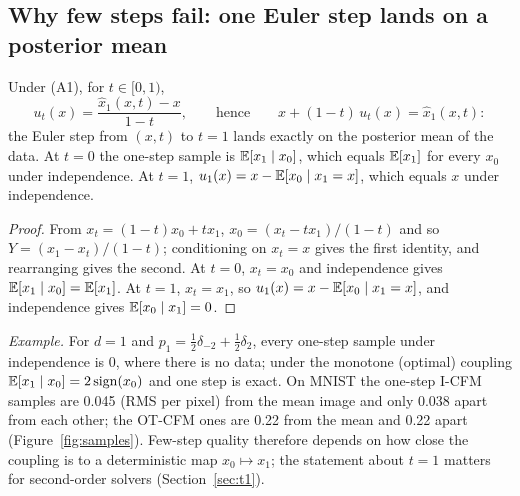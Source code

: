 \subsection{Why few steps fail: one Euler step lands on a posterior mean}\label{sec:onestep}
\begin{proposition}\label{prop:onestep}
Under (A1), for $t\in[0,1)$,
\begin{equation}\label{eq:postmean}
u_t(x)=\frac{\hat x_1(x,t)-x}{1-t},\qquad\text{hence}\qquad x+(1-t)\,u_t(x)=\hat x_1(x,t):
\end{equation}
the Euler step from $(x,t)$ to $t=1$ lands exactly on the posterior mean of the data. At $t=0$ the one-step sample is $\mathbb{E}[x_1\mid x_0]$, which equals $\mathbb{E}[x_1]$ for every $x_0$ under independence. At $t=1$, $u_1(x)=x-\mathbb{E}[x_0\mid x_1=x]$, which equals $x$ under independence.
\end{proposition}
\begin{proof}
From $x_t=(1-t)x_0+tx_1$, $x_0=(x_t-tx_1)/(1-t)$ and so $Y=(x_1-x_t)/(1-t)$; conditioning on $x_t=x$ gives the first identity, and rearranging gives the second. At $t=0$, $x_t=x_0$ and independence gives $\mathbb{E}[x_1\mid x_0]=\mathbb{E}[x_1]$. At $t=1$, $x_t=x_1$, so $u_1(x)=x-\mathbb{E}[x_0\mid x_1=x]$, and independence gives $\mathbb{E}[x_0\mid x_1]=0$.
\end{proof}
\emph{Example.} For $d=1$ and $p_1=\tfrac12\delta_{-2}+\tfrac12\delta_{2}$, every one-step sample under independence is $0$, where there is no data; under the monotone (optimal) coupling $\mathbb{E}[x_1\mid x_0]=2\,\mathrm{sign}(x_0)$ and one step is exact. On MNIST the one-step I-CFM samples are 0.045 (RMS per pixel) from the mean image and only 0.038 apart from each other; the OT-CFM ones are 0.22 from the mean and 0.22 apart (Figure~\ref{fig:samples}). %
Few-step quality therefore depends on how close the coupling is to a deterministic map $x_0\mapsto x_1$; the statement about $t=1$ matters for second-order solvers (Section~\ref{sec:t1}).


